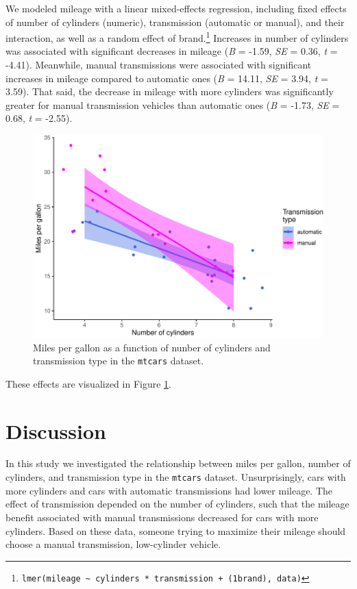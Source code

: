 \documentclass[
  english,
  man,floatsintext]{apa6}
\begin{document}
We modeled mileage with a linear mixed-effects regression, including fixed effects of number of cylinders (numeric), transmission (automatic or manual), and their interaction, as well as a random effect of brand.\footnote{\texttt{lmer(mileage\ \textasciitilde{}\ cylinders\ *\ transmission\ +\ (1\textbar{}brand),\ data)}} Increases in number of cylinders was associated with significant decreases in mileage (\emph{B} = -1.59, \emph{SE} = 0.36, \emph{t} = -4.41). Meanwhile, manual transmissions were associated with significant increases in mileage compared to automatic ones (\emph{B} = 14.11, \emph{SE} = 3.94, \emph{t} = 3.59). That said, the decrease in mileage with more cylinders was significantly greater for manual transmission vehicles than automatic ones (\emph{B} = -1.73, \emph{SE} = 0.68, \emph{t} = -2.55).

\begin{figure}
\centering
\includegraphics{mpg-report-papaja_files/figure-latex/plot-primary-results-1.pdf}
\caption{\label{fig:plot-primary-results}Miles per gallon as a function of nunber of cylinders and transmission type in the \texttt{mtcars} dataset.}
\end{figure}

These effects are visualized in Figure \ref{fig:plot-primary-results}.

\hypertarget{disc}{%
\section{Discussion}\label{disc}}

In this study we investigated the relationship between miles per gallon, number of cylinders, and transmission type in the \texttt{mtcars} dataset. Unsurprisingly, cars with more cylinders and cars with automatic transmissions had lower mileage. The effect of transmission depended on the number of cylinders, such that the mileage benefit associated with manual transmissions decreased for cars with more cylinders. Based on these data, someone trying to maximize their mileage should choose a manual transmission, low-cylinder vehicle.
\end{document}
